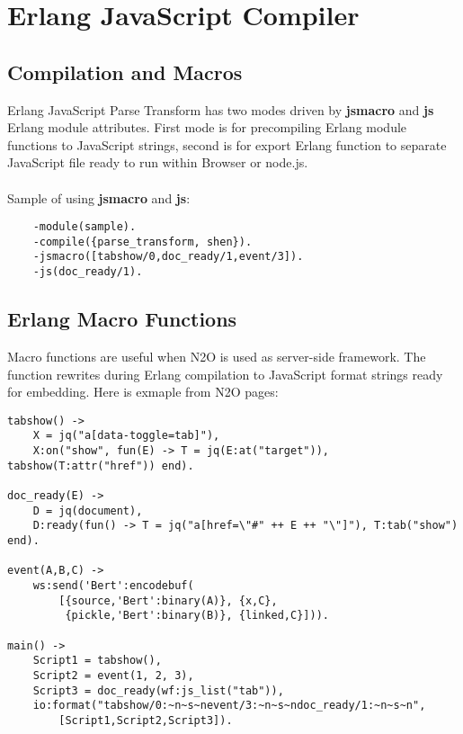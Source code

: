 \section{Erlang JavaScript Compiler}

\subsection{Compilation and Macros}
Erlang JavaScript Parse Transform has two modes driven
by {\bf \-jsmacro} and {\bf \-js} Erlang module attributes.
First mode is for precompiling Erlang module functions
to JavaScript strings, second is for export Erlang function
to separate JavaScript file ready to run within Browser or node.js.

\paragraph{}
Sample of using {\bf \-jsmacro} and {\bf \-js}:

\vspace{1\baselineskip}
\begin{lstlisting}
    -module(sample).
    -compile({parse_transform, shen}).
    -jsmacro([tabshow/0,doc_ready/1,event/3]).
    -js(doc_ready/1).
\end{lstlisting}

\subsection{Erlang Macro Functions}
Macro functions are useful when N2O is used as server-side framework.
The function rewrites during Erlang compilation to JavaScript format
strings ready for embedding. Here is exmaple from N2O pages:

\begin{lstlisting}
tabshow() ->
    X = jq("a[data-toggle=tab]"),
    X:on("show", fun(E) -> T = jq(E:at("target")), tabshow(T:attr("href")) end).

doc_ready(E) ->
    D = jq(document),
    D:ready(fun() -> T = jq("a[href=\"#" ++ E ++ "\"]"), T:tab("show") end).

event(A,B,C) ->
    ws:send('Bert':encodebuf(
        [{source,'Bert':binary(A)}, {x,C},
         {pickle,'Bert':binary(B)}, {linked,C}])).

main() ->
    Script1 = tabshow(),
    Script2 = event(1, 2, 3),
    Script3 = doc_ready(wf:js_list("tab")),
    io:format("tabshow/0:~n~s~nevent/3:~n~s~ndoc_ready/1:~n~s~n",
        [Script1,Script2,Script3]).
\end{lstlisting}
\vspace{1\baselineskip}

